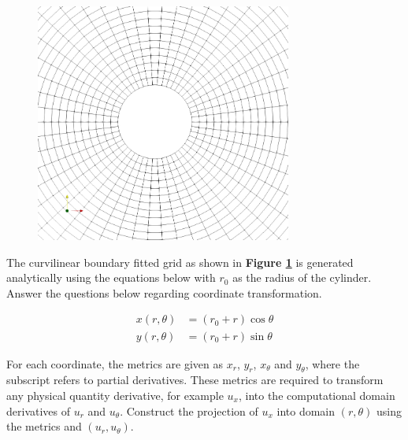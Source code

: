 \clearpage		%
\question{}\label{q4}


		\begin{figure}[H] %
		\centering
		\includegraphics[width=0.75\textwidth, height=0.5\textwidth]{cylinderGrid-1}
		\caption{\rajah}
		\label{fig:cylinder}
	    \end{figure}	

The curvilinear boundary fitted grid as shown in \textbf{Figure \ref{fig:cylinder}}
is generated analytically using the equations below with $r_{0}$ as the radius of the cylinder. Answer the questions below regarding coordinate transformation.

\begin{subequations}
\begin{align}
x(r, \theta) &= (r_{0} + r) \cos \theta \nonumber  \\ \nonumber
y(r, \theta) &= (r_{0} + r)\sin \theta
\end{align}
\end{subequations}
		
\listbeginx	%

\item For each coordinate, the metrics are given as $x_{r}$, $y_{r}$, $x_{\theta}$ and $y_{\theta}$, where the subscript refers to partial derivatives. These metrics are required to transform any physical quantity derivative, for example $u_{x}$, into the computational domain derivatives of $u_{r}$ and $u_{\theta}$. Construct the projection of $u_{x}$ into domain $(r, \theta)$ using the metrics and $(u_{r},u_{\theta})$. 

		
